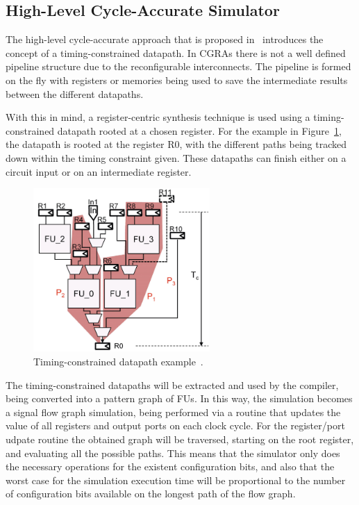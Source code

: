 \subsection{High-Level Cycle-Accurate Simulator}
\label{subsection:hlcycle}

The high-level cycle-accurate approach that is proposed in~\cite{chen:CGRA}
introduces the concept of a timing-constrained datapath. In \ac{CGRA}s there is
not a well defined pipeline structure due to the reconfigurable
interconnects. The pipeline is formed on the fly with registers or memories
being used to save the intermediate results between the different datapaths.

With this in mind, a register-centric synthesis technique is used using a
timing-constrained datapath rooted at a chosen register. For the example in
Figure~\ref{fig:datapaths}, the datapath is rooted at the register R0, with the
different paths being tracked down within the timing constraint given. These
datapaths can finish either on a circuit input or on an intermediate register.

\begin{figure}[!htb]
	\centering
	\includegraphics[width=0.6\textwidth]{Figures/Datapaths.png}
	\caption{Timing-constrained datapath example~\cite{chen:CGRA}.}
	\label{fig:datapaths}
\end{figure}

The timing-constrained datapaths will be extracted and used by the compiler,
being converted into a pattern graph of \ac{FU}s. In this way, the simulation
becomes a signal flow graph simulation, being performed via a routine that
updates the value of all registers and output ports on each clock cycle. For the
register/port udpate routine the obtained graph will be traversed, starting on
the root register, and evaluating all the possible paths. This means that the
simulator only does the necessary operations for the existent configuration
bits, and also that the worst case for the simulation execution time will be
proportional to the number of configuration bits available on the longest path
of the flow graph.

